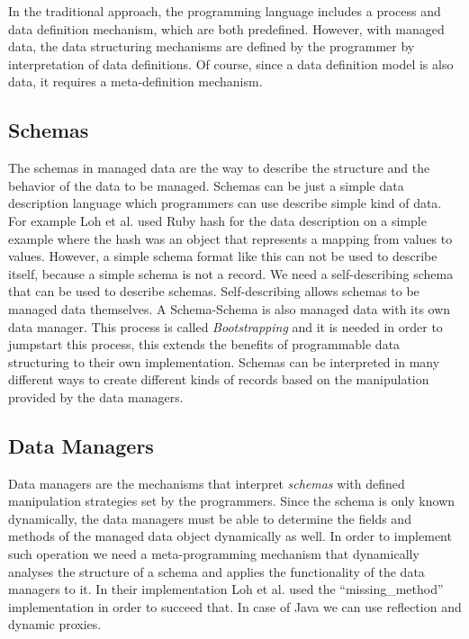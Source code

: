 In the traditional approach, the programming language includes a process and data definition mechanism, which are both predefined. 
However, with managed data, the data structuring mechanisms are defined by the programmer by interpretation of data definitions. 
Of course, since a data definition model is also data, it requires a meta-definition mechanism.

\subsection{Schemas}\label{Schemas}
The schemas in managed data are the way to describe the structure and the behavior of the data to be managed. 
Schemas can be just a simple data description language which programmers can use describe simple kind of data. 
For example Loh et al. \cite{loh2012managed} used Ruby hash for the data description on a simple example where the hash was an object that represents a mapping from values to values. 
However, a simple schema format like this can not be used to describe itself, because a simple schema is not a record. 
We need a self-describing schema that can be used to describe schemas. 
Self-describing allows schemas to be managed data themselves.
A Schema-Schema is also managed data with its own data manager. This process is called \textit{Bootstrapping} and it is needed in order to jumpstart this process, this extends the benefits of programmable data structuring to their own implementation.
Schemas can be interpreted in many different ways to create different kinds of records based on the manipulation provided by the data managers.

\subsection{Data Managers}\label{Data Managers}
Data managers are the mechanisms that interpret \textit{schemas} with defined manipulation strategies set by the programmers. 
Since the schema is only known dynamically, the data managers must be able to determine the fields and methods of the managed data object dynamically as well.
In order to implement such operation we need a meta-programming mechanism that dynamically analyses the structure of a schema and applies the functionality of the data managers to it.
In their implementation Loh et al. \cite{loh2012managed} used the ``missing\_method'' implementation in order to succeed that.
In case of Java we can use reflection and dynamic proxies.

